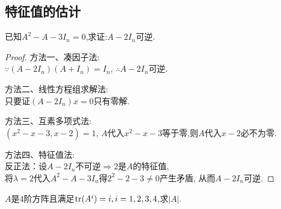 \subsection{特征值的估计}
\begin{example}
  已知$A^2-A-3I_n=0$,求证:$A-2I_n$可逆.
\end{example}
\begin{proof}

  {\heiti 方法一、凑因子法:}\\
  $\because (A-2I_n)(A+I_n)=I_n$, $\therefore A-2I_n$可逆.

  {\heiti 方法二、线性方程组求解法:}\\
  只要证$(A-2I_n)x=0$只有零解.

  {\heiti 方法三、互素多项式法:}\\
  $(x^2-x-3, x-2)=1$, $A$代入$x^2-x-3$等于零,则$A$代入$x-2$必不为零.

  {\heiti 方法四、特征值法:}\\
  反正法：设$A-2I_n$不可逆$\Longrightarrow 2$是$A$的特征值,\\
  将$\lambda=2$代入$A^2-A-3I_n$得$2^2-2-3 \neq 0$产生矛盾,
  从而$A-2I_n$可逆.
\end{proof}
\begin{example}
  $A$是$4$阶方阵且满足$\operatorname{tr}(A^i)=i, i=1,2,3,4$,求$|A|$.
\end{example}

